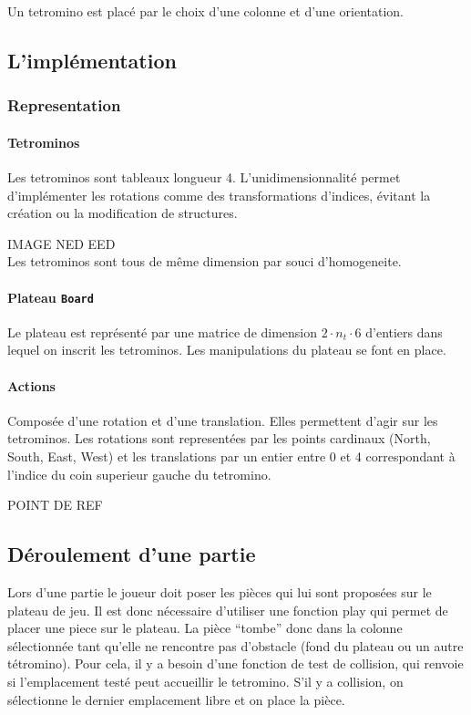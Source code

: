 \documentclass{article}
\begin{document}
Un tetromino est plac\'e par le choix d'une colonne et d'une orientation.

\subsection{L'impl\'ementation}

\subsubsection{Representation}

\paragraph{Tetrominos}
Les tetrominos sont tableaux longueur 4. L'unidimensionnalit\'e permet
d'impl\'ementer les rotations comme des transformations d'indices, \'evitant la
cr\'eation ou la modification de structures.

IMAGE NED EED\\
Les tetrominos sont tous de même dimension par souci d'homogeneite.

\paragraph{Plateau \texttt{Board}}
Le plateau est repr\'esent\'e par une matrice de dimension
\(2\cdot n_t\cdot 6\) d'entiers dans lequel on inscrit les tetrominos. Les
manipulations du plateau se font en place.


\paragraph{Actions}
Composée d'une rotation et d'une translation. Elles permettent d'agir sur les
tetrominos. Les rotations sont representées par les points cardinaux
(North, South, East, West) et les translations par un entier entre 0 et 4
correspondant à l'indice du coin superieur gauche du tetromino.

POINT DE REF

\subsection{D\'eroulement d'une partie}
Lors d'une partie le joueur doit poser les pièces qui lui sont proposées sur
le plateau de jeu. Il est donc nécessaire d'utiliser une fonction play qui
permet de placer une piece sur le plateau. La pièce ``tombe'' donc dans la
colonne sélectionnée tant qu'elle ne rencontre pas d'obstacle (fond du plateau
ou un autre tétromino). Pour cela, il y a besoin d'une fonction de test de
collision, qui renvoie si l'emplacement testé peut accueillir le tetromino.
S'il y a collision, on sélectionne le dernier emplacement libre et on place la
pièce.
\end{document}
